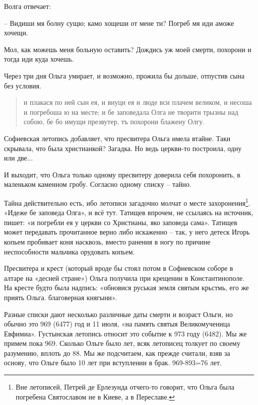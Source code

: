 Волга отвечает:

 – Видиши мя болну сущю; камо хощеши от мене ти? Погреб мя иди аможе хочещи.

Мол, как можешь меня больную оставить? Дождись уж моей смерти, похорони и тогда иди куда хочешь.

Через три дня Ольга умирает, и возможно, прожила бы дольше, отпустив сына без условия.

\begin{quotation} 
и плакася по ней сын ея, и внуци ея и люде вси плачем великом, и несоша и погребоша ю на месте; и бе заповедала Олга не творити трызны над собою, бе бо имущи презвутер, тъ похорони блажену Олгу.
\end{quotation} 

Софиевская летопись добавляет, что пресвитера Ольга имела втайне. Таки скрывала, что была христианкой? Загадка. Но ведь церкви-то построила, одну или две...


И выходит, что Ольга только одному пресвитеру доверила себя похоронить, в маленьком каменном гробу. Согласно одному списку – тайно.

Тайна действительно есть, ибо летописи загадочно молчат о месте захоронения\footnote{Вне летописей, Петрей де Ерлезунда отчего-то говорит, что Ольга была погребена Святославом не в Киеве, а в Переславе.}. «Идеже бе заповеда Олга», и всё тут. Татищев впрочем, не ссылаясь на источник, пишет: «и погребли ея у церкви со Христианы, яко заповеда сама». Татищев может передавать прочитанное верно либо искаженно – так, у него детеск Игорь копьем пробивает коня насквозь, вместо ранения в ногу по причине неспособности мальчика орудовать копьем.

Пресвитера и крест (который вроде бы стоял потом в Софиевском соборе в алтаре на «десней стране») Ольга получила при крещении в Константинополе. На кресте будто была надпись: «обновися руськая земля святым крьстмь, его же приять Ольга. благоверная княгыни».

Разные списки дают несколько различные даты смерти и возраст Ольги, но обычно это 969 (6477) год и 11 июля, «на память святыя Великомученица Евфимиа». Густынская летопись относит это событие к 973 году (6482). Мы же примем пока 969. Сколько Ольге было лет, всяк летописец толкует по своему разумению, вплоть до 88. Мы же подсчитаем, как прежде считали, взяв за основу, что Ольге было 10 лет при вступлении в брак. 969-893=76 лет.


